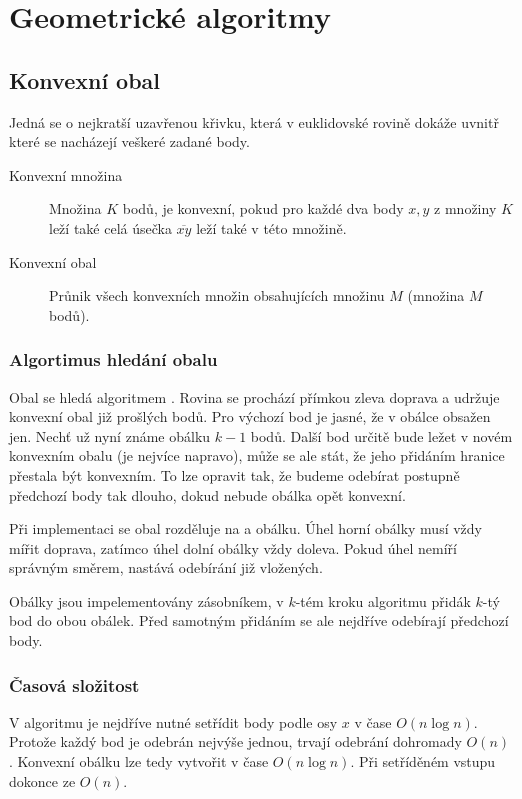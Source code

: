 \section{Geometrické algoritmy}

\subsection{Konvexní obal}

Jedná se o nejkratší uzavřenou křivku, která v euklidovské rovině dokáže uvnitř které se nacházejí veškeré zadané body.

\begin{description}
    \item[Konvexní množina] Množina $K$ bodů, je konvexní, pokud pro každé dva body $x, y$ z množiny $K$ leží také celá úsečka $\overline{xy}$ leží také v této množině.
    \item[Konvexní obal] Průnik všech konvexních množin obsahujících množinu $M$ (množina $M$ bodů).
\end{description}

\subsubsection{Algortimus hledání obalu}

Obal se hledá algoritmem .
Rovina se prochází přímkou zleva doprava a udržuje konvexní obal již prošlých bodů.
Pro výchozí bod je jasné, že v obálce obsažen jen.
Nechť už nyní známe obálku $k-1$ bodů.
Další bod určitě bude ležet v novém konvexním obalu (je nejvíce napravo), může se ale stát, že jeho přidáním hranice přestala být konvexním.
To lze opravit tak, že budeme odebírat postupně předchozí body tak dlouho, dokud nebude obálka opět konvexní.

Při implementaci se obal rozděluje na  a  obálku.
Úhel horní obálky musí vždy mířit doprava, zatímco úhel dolní obálky vždy doleva.
Pokud úhel nemíří správným směrem, nastává odebírání již vložených.

Obálky jsou impelementovány zásobníkem, v $k$-tém kroku algoritmu přidák $k$-tý bod do obou obálek.
Před samotným přidáním se ale nejdříve odebírají předchozí body.

\subsubsection{Časová složitost}

V algoritmu je nejdříve nutné setřídit body podle osy $x$ v čase $O(n \log{n})$.
Protože každý bod je odebrán nejvýše jednou, trvají odebrání dohromady $O(n)$.
Konvexní obálku lze tedy vytvořit v čase $O(n \log{n})$.
Při setříděném vstupu dokonce ze $O(n)$.

